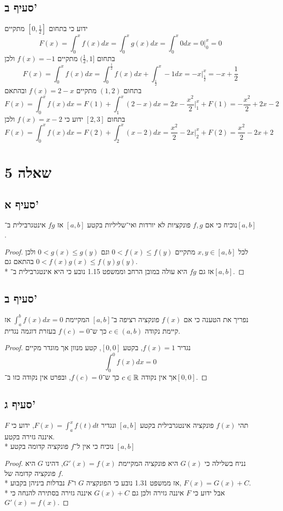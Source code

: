 \subsection{סעיף ב'}
ידוע כי בתחום $[0, \frac{1}{2}]$ מתקיים
\[
	F(x) = \int_0^x f(x) dx = \int_0^x g(x) dx = \int_0^x 0dx = 0 \Big|_0^x = 0
\]
בתחום $(\frac{1}{2}, 1]$ מתקיים $f(x) = -1$ ולכן %
\[
	F(x) = \int_0^x f(x) dx = \int_0^\frac{1}{2} f(x) dx + \int_\frac{1}{2}^x -1 dx = -x \Big|_\frac{1}{2}^x = -x + \frac{1}{2}
\]
בתחום $(1, 2)$ מתקיים $f(x) = 2 - x$ ובהתאם
\[
	F(x) = \int_0^x f(x) dx = F(1) + \int_1^x (2 - x) dx = 2x - \frac{x^2}{2} \Big|_1^x + F(1) = - \frac{x^2}{2} + 2x - 2
\]
בתחום $[2, 3]$ ידוע כי $f(x) = x - 2$ ולכן
\[
	F(x) = \int_0^x f(x) dx = F(2) + \int_2^x (x - 2) dx = \frac{x^2}{2} - 2x \Big|_2^x + F(2) = \frac{x^2}{2} - 2x + 2
\]

\section{שאלה 5}
\subsection{סעיף א'}
נוכיח כי אם $f, g$ פונקציות לא יורדות ואי־שליליות בקטע $[a, b]$ אז $fg$ אינטגרבילית ב־$[a, b]$.
\begin{proof}
	לכל $x, y \in [a, b]$ מתקיים $0 < f(x) \le f(y)$ וגם $0 < g(x) \le g(y)$ ולכן בהתאם גם $0 < f(x) g(x) \le f(y) g(y)$. \\*
	אז גם $fg$ היא עולה במובן הרחב וממשפט 1.15 נובע כי היא אינטגרבילית ב־$[a, b]$.
\end{proof}

\subsection{סעיף ב'}
נפריך את הטענה כי אם $f(x)$ פונקציה רציפה ב־$[a, b]$ המקיימת $\int_a^b f(x) dx = 0$ אז קיימת נקודה $c \in (a, b)$ כך ש־$f(c) = 0$ בעזרת דוגמה נגדית.
\begin{proof}
	נגדיר $f(x) = 1$, בקטע $[0, 0]$, קטע מנוון אך מוגדר מקיים
	\[
		\int_0^0 f(x) dx = 0
	\]
	אך אין נקודה $c \in \mathbb{R}$ כך ש־$f(c) = 0$, ובפרט אין נקודה כזו ב־$[0, 0]$.
\end{proof}

\subsection{סעיף ג'}
תהי $f(x)$ פונקציה אינטגרבילית בקטע $[a, b]$ ונגדיר $F(x) = \int_a^x f(t) dt$, ידוע כי $F$ איננה גזירה בקטע. \\*
נוכיח כי אין ל־$f$ פונקציה קדומה בקטע $[a, b]$
\begin{proof}
	נניח בשלילה כי $G(x)$ היא פונקציה המקיימת $G'(x) = f(x)$, דהינו $G$ היא פונקציה קדומה של $f$. \\*
	אז ממשפט 1.31 נובע כי הפונקציה $G$ ו־$F$ נבדלות ביניהן בקבוע, $F(x) = G(x) + C$. \\*
	אבל ידוע כי $F$ איננה גזירה ולכן גם $G(x) + C$ איננה גזירה בסתירה להנחה כי $G'(x) = f(x)$.
\end{proof}

